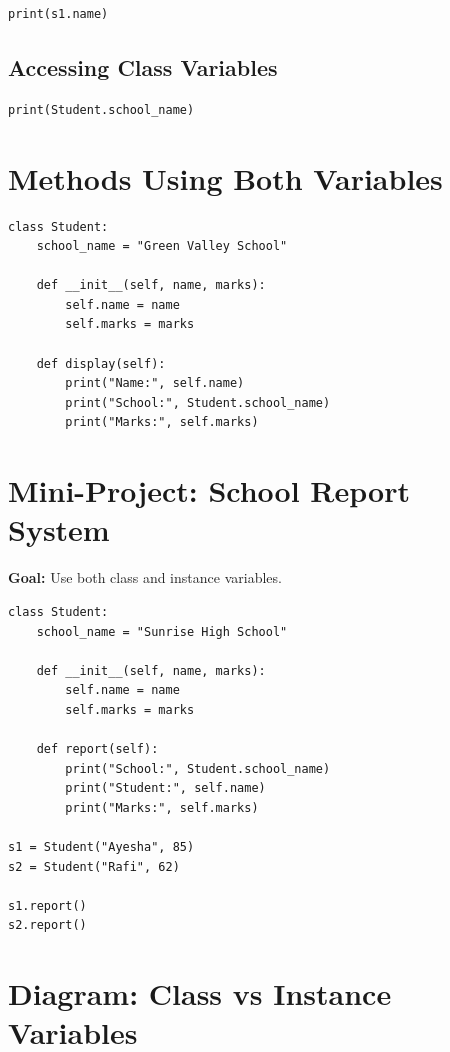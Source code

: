 \begin{verbatim}
print(s1.name)
\end{verbatim}

\subsection{Accessing Class Variables}

\begin{verbatim}
print(Student.school_name)
\end{verbatim}

\section{Methods Using Both Variables}

\begin{verbatim}
class Student:
    school_name = "Green Valley School"

    def __init__(self, name, marks):
        self.name = name
        self.marks = marks

    def display(self):
        print("Name:", self.name)
        print("School:", Student.school_name)
        print("Marks:", self.marks)
\end{verbatim}

\section{Mini-Project: School Report System}

\textbf{Goal:} Use both class and instance variables.

\begin{verbatim}
class Student:
    school_name = "Sunrise High School"

    def __init__(self, name, marks):
        self.name = name
        self.marks = marks

    def report(self):
        print("School:", Student.school_name)
        print("Student:", self.name)
        print("Marks:", self.marks)

s1 = Student("Ayesha", 85)
s2 = Student("Rafi", 62)

s1.report()
s2.report()
\end{verbatim}

\section{Diagram: Class vs Instance Variables}

